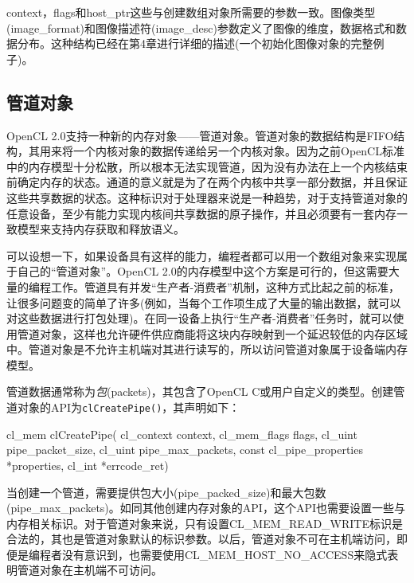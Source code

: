 context，flags和host\_\allowbreak{}ptr这些与创建数组对象所需要的参数一致。图像类型(image\_\allowbreak{}format)和图像描述符(image\_\allowbreak{}desc)参数定义了图像的维度，数据格式和数据分布。这种结构已经在第4章进行详细的描述(一个初始化图像对象的完整例子)。

\subsection{管道对象}

OpenCL 2.0支持一种新的内存对象——管道对象。管道对象的数据结构是FIFO结构，其用来将一个内核对象的数据传递给另一个内核对象。因为之前OpenCL标准中的内存模型十分松散，所以根本无法实现管道，因为没有办法在上一个内核结束前确定内存的状态。通道的意义就是为了在两个内核中共享一部分数据，并且保证这些共享数据的状态。这种标识对于处理器来说是一种趋势，对于支持管道对象的任意设备，至少有能力实现内核间共享数据的原子操作，并且必须要有一套内存一致模型来支持内存获取和释放语义。

可以设想一下，如果设备具有这样的能力，编程者都可以用一个数组对象来实现属于自己的“管道对象”。OpenCL 2.0的内存模型中这个方案是可行的，但这需要大量的编程工作。管道具有并发“生产者-消费者”机制，这种方式比起之前的标准，让很多问题变的简单了许多(例如，当每个工作项生成了大量的输出数据，就可以对这些数据进行打包处理)。在同一设备上执行“生产者-消费者”任务时，就可以使用管道对象，这样也允许硬件供应商能将这块内存映射到一个延迟较低的内存区域中。管道对象是不允许主机端对其进行读写的，所以访问管道对象属于设备端内存模型。

管道数据通常称为\emph{包}(packets)，其包含了OpenCL C或用户自定义的类型。创建管道对象的API为\texttt{clCreatePipe()}，其声明如下：

\begin{codebox}[cpp]
cl_mem
clCreatePipe(
  cl_context context,
  cl_mem_flags flags,
  cl_uint pipe_packet_size,
  cl_uint pipe_max_packets,
  const cl_pipe_properties *properties,
  cl_int *errcode_ret)
\end{codebox}

当创建一个管道，需要提供包大小(pipe\_\allowbreak{}packed\_\allowbreak{}size)和最大包数(pipe\_\allowbreak{}max\_\allowbreak{}packets)。如同其他创建内存对象的API，这个API也需要设置一些与内存相关标识。对于管道对象来说，只有设置CL\_\allowbreak{}MEM\_\allowbreak{}READ\_\allowbreak{}WRITE标识是合法的，其也是管道对象默认的标识参数。以后，管道对象不可在主机端访问，即便是编程者没有意识到，也需要使用CL\_\allowbreak{}MEM\_\allowbreak{}HOST\_\allowbreak{}NO\_\allowbreak{}ACCESS来隐式表明管道对象在主机端不可访问。



